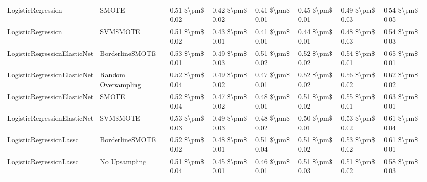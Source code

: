 \begin{tabular}{llllllll}
             LogisticRegression &                         SMOTE &     0.51 \$\textbackslash pm\$ 0.02 &           0.42 \$\textbackslash pm\$ 0.02 &       0.41 \$\textbackslash pm\$ 0.01 &        0.45 \$\textbackslash pm\$ 0.01 &                         0.49 \$\textbackslash pm\$ 0.03 & 0.54 \$\textbackslash pm\$ 0.05 \\
             LogisticRegression &                      SVMSMOTE &     0.51 \$\textbackslash pm\$ 0.02 &           0.43 \$\textbackslash pm\$ 0.01 &       0.41 \$\textbackslash pm\$ 0.01 &        0.44 \$\textbackslash pm\$ 0.01 &                         0.48 \$\textbackslash pm\$ 0.03 & 0.54 \$\textbackslash pm\$ 0.03 \\
   LogisticRegressionElasticNet &               BorderlineSMOTE &     0.53 \$\textbackslash pm\$ 0.01 &           0.49 \$\textbackslash pm\$ 0.03 &       0.51 \$\textbackslash pm\$ 0.02 &        0.52 \$\textbackslash pm\$ 0.02 &                         0.54 \$\textbackslash pm\$ 0.01 & 0.65 \$\textbackslash pm\$ 0.01 \\
   LogisticRegressionElasticNet &           Random Oversampling &     0.52 \$\textbackslash pm\$ 0.04 &           0.49 \$\textbackslash pm\$ 0.02 &       0.47 \$\textbackslash pm\$ 0.01 &        0.52 \$\textbackslash pm\$ 0.02 &                         0.56 \$\textbackslash pm\$ 0.02 & 0.62 \$\textbackslash pm\$ 0.02 \\
   LogisticRegressionElasticNet &                         SMOTE &     0.52 \$\textbackslash pm\$ 0.04 &           0.47 \$\textbackslash pm\$ 0.02 &       0.48 \$\textbackslash pm\$ 0.01 &        0.51 \$\textbackslash pm\$ 0.02 &                         0.55 \$\textbackslash pm\$ 0.01 & 0.63 \$\textbackslash pm\$ 0.01 \\
   LogisticRegressionElasticNet &                      SVMSMOTE &     0.53 \$\textbackslash pm\$ 0.03 &           0.49 \$\textbackslash pm\$ 0.03 &       0.48 \$\textbackslash pm\$ 0.02 &        0.50 \$\textbackslash pm\$ 0.01 &                         0.53 \$\textbackslash pm\$ 0.02 & 0.61 \$\textbackslash pm\$ 0.04 \\
        LogisticRegressionLasso &               BorderlineSMOTE &     0.52 \$\textbackslash pm\$ 0.02 &           0.48 \$\textbackslash pm\$ 0.01 &       0.51 \$\textbackslash pm\$ 0.04 &        0.51 \$\textbackslash pm\$ 0.02 &                         0.53 \$\textbackslash pm\$ 0.02 & 0.61 \$\textbackslash pm\$ 0.01 \\
        LogisticRegressionLasso &                 No Upsampling &     0.51 \$\textbackslash pm\$ 0.04 &           0.45 \$\textbackslash pm\$ 0.01 &       0.46 \$\textbackslash pm\$ 0.01 &        0.51 \$\textbackslash pm\$ 0.03 &                         0.51 \$\textbackslash pm\$ 0.02 & 0.58 \$\textbackslash pm\$ 0.03 \\

\end{tabular}
